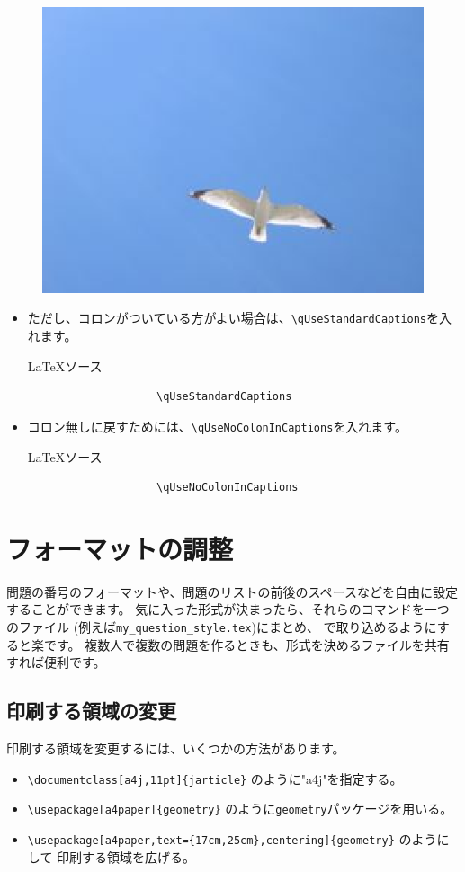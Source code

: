 \documentclass[dvipdfmx,a4j,11pt]{jarticle}
\newenvironment{inputbox}{%
	\begin{itembox}[r]{\LaTeX ソース}
}{
	\end{itembox}
}
\begin{document}
		\begin{figure}[htbp]
			\begin{center}
				\includegraphics[width=0.4\linewidth]{seagull2.eps}
				\caption{\label{fig:seagull}}
			\end{center}
		\end{figure}
		
	\begin{itemize}
		\item ただし、コロンがついている方がよい場合は、{\tt \verb"\qUseStandardCaptions"}を入れます。
			\begin{inputbox}
				\begin{verbatim}
					\qUseStandardCaptions
				\end{verbatim}
			\end{inputbox}
		\item コロン無しに戻すためには、{\tt \verb"\qUseNoColonInCaptions"}を入れます。
			\begin{inputbox}
				\begin{verbatim}
					\qUseNoColonInCaptions
				\end{verbatim}
			\end{inputbox}
	\end{itemize}


\clearpage
\section{フォーマットの調整}
	問題の番号のフォーマットや、問題のリストの前後のスペースなどを自由に設定することができます。
	気に入った形式が決まったら、それらのコマンドを一つのファイル
	(例えば{\tt \verb"my_question_style.tex"})にまとめ、
	{\tt \verb""}で取り込めるようにすると楽です。
	複数人で複数の問題を作るときも、形式を決めるファイルを共有すれば便利です。
	
\subsection{印刷する領域の変更}
	印刷する領域を変更するには、いくつかの方法があります。
	\begin{itemize}
		\item {\tt \verb"\documentclass[a4j,11pt]{jarticle}"} のように"a4j"を指定する。
		\item {\tt \verb"\usepackage[a4paper]{geometry}"} のように{\tt geometry}パッケージを用いる。
		\item {\tt \verb"\usepackage[a4paper,text={17cm,25cm},centering]{geometry}"} のようにして
			印刷する領域を広げる。
	\end{itemize}
	
\end{document}
